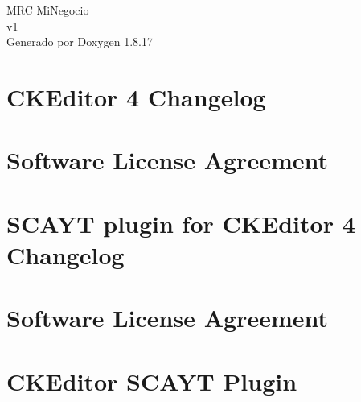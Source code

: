 \let\mypdfximage\pdfximage\def\pdfximage{\immediate\mypdfximage}\documentclass[twoside]{book}
\newcommand{\+}{\discretionary{\mbox{\scriptsize$\hookleftarrow$}}{}{}}
\newcommand{\clearemptydoublepage}{%
  \newpage{\pagestyle{empty}\cleardoublepage}%
}
\begin{document}
\hypersetup{pageanchor=false,
             bookmarksnumbered=true,
             pdfencoding=unicode
            }
\begin{titlepage}
\vspace*{7cm}
\begin{center}%
{\Large M\+RC Mi\+Negocio \\[1ex]\large v1 }\\
\vspace*{1cm}
{\large Generado por Doxygen 1.8.17}\\
\end{center}
\end{titlepage}
\clearemptydoublepage
{}
\tableofcontents
\clearemptydoublepage
{}
\hypersetup{pageanchor=true}

\chapter{C\+K\+Editor 4 Changelog}
\label{md_res_plugins_ckeditor__c_h_a_n_g_e_s}

\chapter{Software License Agreement}
\label{md_res_plugins_ckeditor__l_i_c_e_n_s_e}

\chapter{S\+C\+A\+YT plugin for C\+K\+Editor 4 Changelog}
\label{md_res_plugins_ckeditor_plugins_scayt__c_h_a_n_g_e_l_o_g}

\chapter{Software License Agreement}
\label{md_res_plugins_ckeditor_plugins_scayt__l_i_c_e_n_s_e}

\chapter{C\+K\+Editor S\+C\+A\+YT Plugin}
\label{md_res_plugins_ckeditor_plugins_scayt__r_e_a_d_m_e}

\end{document}

